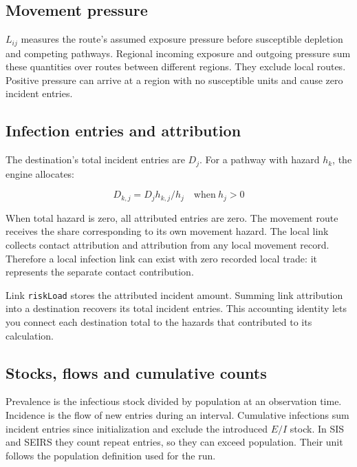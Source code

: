 \documentclass[11pt,a4paper]{article}
\begin{document}
\subsection{Movement pressure}\label{movement-pressure}

\(L_{ij}\) measures the route's assumed exposure pressure before
susceptible depletion and competing pathways. Regional incoming exposure
and outgoing pressure sum these quantities over routes between different
regions. They exclude local routes. Positive pressure can arrive at a
region with no susceptible units and cause zero incident entries.

\subsection{Infection entries and
attribution}\label{infection-entries-and-attribution}

The destination's total incident entries are \(D_{j}\). For a pathway
with hazard \(h_{k}\), the engine allocates:

\[
D_{k,j}=D_j h_{k,j}/h_j\quad \mathrm{when}\ h_j>0
\]

When total hazard is zero, all attributed entries are zero. The movement
route receives the share corresponding to its own movement hazard. The
local link collects contact attribution and attribution from any local
movement record. Therefore a local infection link can exist with zero
recorded local trade: it represents the separate contact contribution.

Link \nolinkurl{riskLoad} stores the attributed incident amount. Summing
link attribution into a destination recovers its total incident entries.
This accounting identity lets you connect each destination total to the
hazards that contributed to its calculation.

\subsection{Stocks, flows and cumulative
counts}\label{stocks-flows-and-cumulative-counts}

Prevalence is the infectious stock divided by population at an
observation time. Incidence is the flow of new entries during an
interval. Cumulative infections sum incident entries since
initialization and exclude the introduced \(E/I\) stock. In SIS and
SEIRS they count repeat entries, so they can exceed population. Their
unit follows the population definition used for the run.
\end{document}
